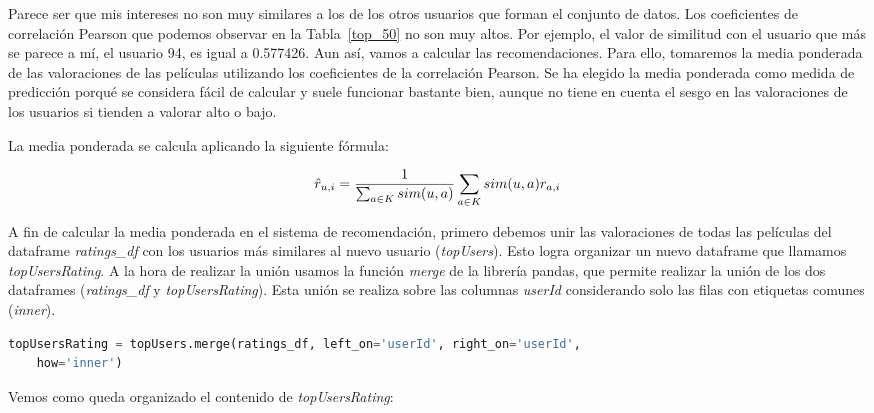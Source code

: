\documentclass{uimppracticas}
\begin{document}
Parece ser que mis intereses no son muy similares a los de los otros usuarios que forman el conjunto de datos. Los coeficientes de correlación Pearson que podemos observar en la Tabla~\ref{top_50} no son muy altos. Por ejemplo, el valor de similitud con el usuario que más se parece a mí, el usuario 94, es igual a 0.577426. Aun así, vamos a calcular las recomendaciones. Para ello, tomaremos la media ponderada de las valoraciones de las películas utilizando los coeficientes de la correlación Pearson. Se ha elegido la media ponderada como medida de predicción porqué se considera fácil de calcular y suele funcionar bastante bien, aunque no tiene en cuenta el sesgo en las valoraciones de los usuarios si tienden a valorar alto o bajo. 

La media ponderada se calcula aplicando la siguiente fórmula:

\begin{equation}\label{media_ponderada}
	\large \hat{r}_{u,i} = \frac{1}{\sum_{a\in K}sim(u,a)} \sum_{a\in K }sim(u,a) r_{a,i}
\end{equation}

A fin de calcular la media ponderada en el sistema de recomendación, primero debemos unir las valoraciones de todas las películas del dataframe \textit{ratings\_df} con los usuarios más similares al nuevo usuario (\textit{topUsers}). Esto logra organizar un nuevo dataframe que llamamos \textit{topUsersRating}. A la hora de realizar la unión usamos la función \textit{merge} de la librería pandas, que permite realizar la unión de los dos dataframes (\textit{ratings\_df} y \textit{topUsersRating}). Esta unión se realiza sobre las columnas \textit{userId} considerando solo las filas con etiquetas comunes (\textit{inner}). 

\begin{lstlisting}[language=python, basicstyle=\small]
topUsersRating = topUsers.merge(ratings_df, left_on='userId', right_on='userId', 
	how='inner')
\end{lstlisting}

Vemos como queda organizado el contenido de \textit{topUsersRating}:
\end{document}
